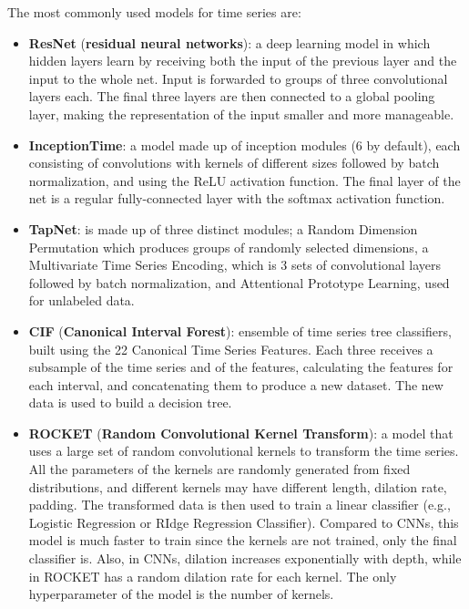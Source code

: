 The most commonly used models for time series are:
\begin{itemize}
    \item \textbf{ResNet} (\textbf{residual neural networks}): a deep learning model in which hidden layers learn by receiving both the input of the previous layer and the input to the whole net. Input is forwarded to groups of three convolutional layers each. The final three layers are then connected to a global pooling layer, making the representation of the input smaller and more manageable.
    
    \item \textbf{InceptionTime}: a model made up of inception modules (6 by default), each consisting of convolutions with kernels of different sizes followed by batch normalization, and using the ReLU activation function. The final layer of the net is a regular fully-connected layer with the softmax activation function.
    
    \item \textbf{TapNet}: is made up of three distinct modules; a Random Dimension Permutation which produces groups of randomly selected dimensions, a Multivariate Time Series Encoding, which is 3 sets of convolutional layers followed by batch normalization, and Attentional Prototype Learning, used for unlabeled data.
    
    \item \textbf{CIF} (\textbf{Canonical Interval Forest}): ensemble of time series tree classifiers, built using the 22 Canonical Time Series Features. Each three receives a subsample of the time series and of the features, calculating the features for each interval, and concatenating them to produce a new dataset. The new data is used to build a decision tree.
 
    \item \textbf{ROCKET} (\textbf{Random Convolutional Kernel Transform}): a model that uses a large set of random convolutional kernels to transform the time series. All the parameters of the kernels are randomly generated from fixed distributions, and different kernels may have different length, dilation rate, padding. The transformed data is then used to train a linear classifier (e.g., Logistic Regression or RIdge Regression Classifier). Compared to CNNs, this model is much faster to train since the kernels are not trained, only the final classifier is. Also, in CNNs, dilation increases exponentially with depth, while in ROCKET has a random dilation rate for each kernel. The only hyperparameter of the model is the number of kernels.


\end{itemize}
